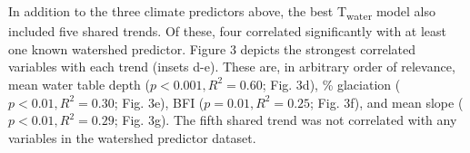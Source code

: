 \documentclass[notitlepage]{article}
\begin{document}

In addition to the three climate predictors above, the best T\textsubscript{water} model also included five shared trends. Of these, four correlated significantly with at least one known watershed predictor. Figure 3 depicts the strongest correlated variables with each trend (insets d-e). These are, in arbitrary order of relevance, mean water table depth ($p<0.001, R^2=0.60$; Fig. 3d), \% glaciation ($p<0.01, R^2=0.30$; Fig. 3e), BFI ($p=0.01, R^2=0.25$; Fig. 3f), and mean slope ($p<0.01, R^2=0.29$; Fig. 3g). The fifth shared trend was not correlated with any variables in the watershed predictor dataset.
\end{document}
